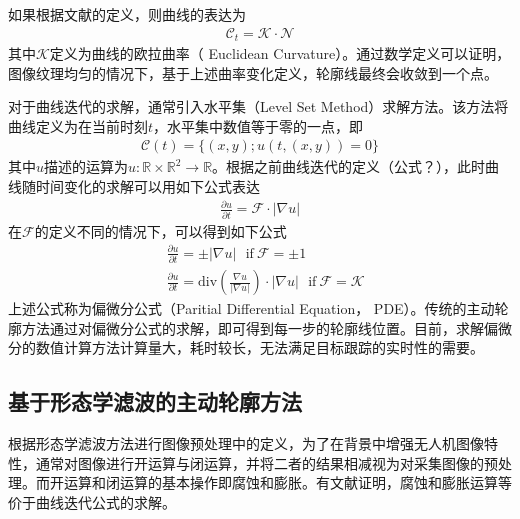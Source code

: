 如果根据文献\cite{guichard2004contrast}的定义，则曲线的表达为
\begin{align}
\mathcal{C}_t = \mathcal{K}\cdot\mathcal{N}
\end{align}
其中$\mathcal{K}$定义为曲线的欧拉曲率（ Euclidean Curvature）。通过数学定义可以证明\cite{kimmel2012numerical}，图像纹理均匀的情况下，基于上述曲率变化定义，轮廓线最终会收敛到一个点。

对于曲线迭代的求解，通常引入水平集（Level Set Method）求解方法。该方法将曲线定义为在当前时刻$t$，水平集中数值等于零的一点，即
\begin{align}
\mathcal{C}(t)=\{(x,y);u(t,(x,y))=0\}
\end{align}
其中$u$描述的运算为$u:\mathbb{R} \times \mathbb{R}^2 \rightarrow \mathbb{R} $。根据之前曲线迭代的定义（公式？），此时曲线随时间变化的求解可以用如下公式表达\cite{kimmel2012numerical}
\begin{align}
\frac{\partial u}{\partial t}=\mathcal{F}\cdot|\nabla u|
\end{align}
在$\mathcal{F}$的定义不同的情况下，可以得到如下公式
\begin{align}
&\frac{\partial u}{\partial t}= \pm|\nabla u|\ \ \ \text{if}\ \mathcal{F} = \pm1 \\
&\frac{\partial u}{\partial t}= \text{div}(\frac{\nabla u}{|\nabla u|})\cdot |\nabla u|\ \ \ \text{if}\ \mathcal{F} = \mathcal{K}
\end{align}
上述公式称为偏微分公式（Paritial Differential Equation， PDE）。传统的主动轮廓方法通过对偏微分公式的求解，即可得到每一步的轮廓线位置。目前，求解偏微分的数值计算方法计算量大，耗时较长，无法满足目标跟踪的实时性的需要。

\subsection{基于形态学滤波的主动轮廓方法}
根据形态学滤波方法进行图像预处理中的定义，为了在背景中增强无人机图像特性，通常对图像进行开运算与闭运算，并将二者的结果相减视为对采集图像的预处理。而开运算和闭运算的基本操作即腐蚀和膨胀。有文献证明，腐蚀和膨胀运算等价于曲线迭代公式的求解。

